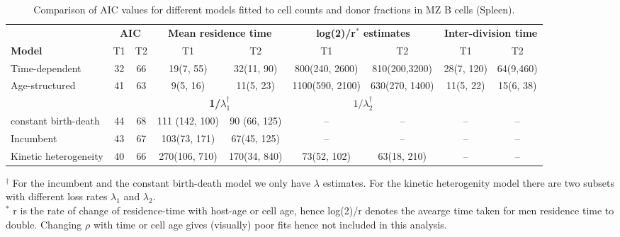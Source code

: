 \documentclass[11.5pt]{article}
\newcommand{\blue}[1]{{\color{blue}{#1}}}
\begin{document}
\blue{Note: Age-structured model gives visually bad fits for FM cells. \\
When  fitting FM cells with the incumbent model, size of the incumbent population is estimated to be $\approx$ 0, making it equivalent to constant birth-death model. When fitting MZ model the counts of incumbent cells are estimated $\approx 10^5$. }


\begin{table}[h!]
	\begin{center}
		\renewcommand{\arraystretch}{1.25}
		\begin{tabular}{ l | c c | c c |c c |c c } 
			\toprule 
		& \multicolumn{2}{c|}{\textbf{AIC}} & \multicolumn{2}{c|}{\textbf{Mean residence time}}  & \multicolumn{2}{c|}{\textbf{log(2)/r$^\ast$ estimates}}  & \multicolumn{2}{c}{\textbf{Inter-division time}} \\
		\cline{2-9}
			\textbf{Model}  &  {\small T1}  &  {\small T2} & {\small T1} & {\small T2} &  {\small T1}  &  {\small T2} & {\small T1} & {\small T2} \\ 
			\toprule
			Time-dependent            & 32   &  66 & 19(7, 55)  & 32(11, 90) & 800(240, 2600) & 810(200,3200) & 28(7, 120) & 64(9,460) \\ 
			Age-structured            & 41   &  63 & 9(5, 16) & 11(5, 23)  & 1100(590, 2100) & 630(270, 1400) & 11(5, 22) & 15(6, 38) \\
			\cline{4-9} 
			& \multicolumn{2}{c|}{\textbf{}} & \multicolumn{2}{c|}{\textbf{1/$\lambda_1^{\dagger}$ }}  & \multicolumn{2}{c|}{\textbf{$1/\lambda_2^{\dagger}$}} & \multicolumn{2}{c}{\textbf{}} \\
			\cline{4-9}
			constant birth-death      & 44  &  68 & 111 (142, 100) & 90 (66, 125) & -- & -- & -- & -- \\ 
			Incumbent                 & 43   &  67 & 103(73, 171) & 67(45, 125) &  -- &  -- &  -- & --  \\ 
			Kinetic heterogeneity     & 40   &  66 & 270(106, 710) & 170(34, 840) & 73(52, 102) & 63(18, 210)& -- & -- \\ 
			\hline
			\toprule 
		\end{tabular}
	\end{center}
	\caption{\small Comparison of AIC values for different models fitted to cell counts and donor fractions in MZ B cells (Spleen).}
	$^{\dagger}$ \footnotesize For the incumbent and the constant birth-death model we only have $\lambda$ estimates. For the kinetic heterogenity model there are two subsets with different loss rates $\lambda_1$ and $\lambda_2$. \\
	$^\ast$ \footnotesize r is the rate of change of residence-time with host-age or cell age, hence log(2)/r denotes the avearge time taken for men residence time to double. Changing $\rho$ with time or cell age gives (visually) poor fits hence not included in this analysis. 
	\label{tab:MZs}
\end{table} 
\end{document}
